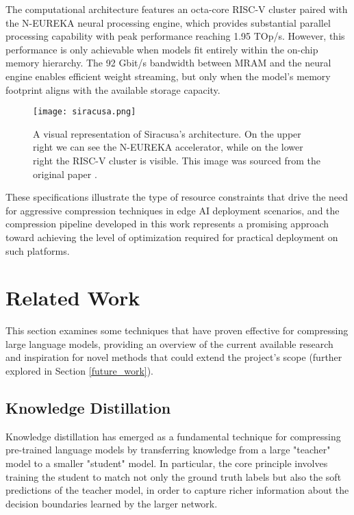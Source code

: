 The computational architecture features an octa-core RISC-V cluster paired with the N-EUREKA neural processing engine, which provides substantial parallel processing capability with peak performance reaching 1.95 TOp/s. However, this performance is only achievable when models fit entirely within the on-chip memory hierarchy. The 92 Gbit/s bandwidth between MRAM and the neural engine enables efficient weight streaming, but only when the model's memory footprint aligns with the available storage capacity.

\begin{figure}[htbp]
    \centering
    \texttt{[image: siracusa.png]}
    \caption[The architecture of Siracusa]{A visual representation of Siracusa's architecture. On the upper right we can see the N-EUREKA accelerator, while on the lower right the RISC-V cluster is visible. This image was sourced from the original paper \cite{target_hardware}.}
    \label{fig:siracusa}
\end{figure}

These specifications illustrate the type of resource constraints that drive the need for aggressive compression techniques in edge AI deployment scenarios, and the compression pipeline developed in this work represents a promising approach toward achieving the level of optimization required for practical deployment on such platforms.
\section{Related Work}

This section examines some techniques that have proven effective for compressing large language models, providing an overview of the current available research and inspiration for novel methods that could extend the project's scope (further explored in Section \ref{future_work}).

\subsection{Knowledge Distillation} \label{distillation_paragraph}

Knowledge distillation \cite{distillation} has emerged as a fundamental technique for compressing pre-trained language models by transferring knowledge from a large "teacher" model to a smaller "student" model. In particular, the core principle involves training the student to match not only the ground truth labels but also the soft predictions of the teacher model, in order to capture richer information about the decision boundaries learned by the larger network.

